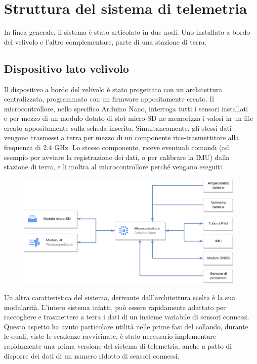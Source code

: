 \documentclass[12pt]{article}
\begin{document}
\section{Struttura del sistema di telemetria}
In linea generale, il sistema è stato articolato in due nodi. Uno installato a bordo del velivolo e l'altro complementare, parte di una stazione di terra.

\subsection{Dispositivo lato velivolo}
Il dispositivo a bordo del velivolo è stato progettato con un architettura centralizzata, programmato con un firmware appositamente creato. Il microcontrollore, nello specifico Arduino Nano, interroga tutti i sensori installati e per mezzo di un modulo dotato di slot micro-SD ne memorizza i valori in un file creato appositamente sulla scheda inserita. Simultaneamente, gli stessi dati vengono trasmessi a terra per mezzo di un componente rice-trasmettitore alla frequenza di 2.4 GHz. Lo stesso componente, riceve eventuali comandi (ad esempio per avviare la registrazione dei dati, o per calibrare la IMU) dalla stazione di terra, e li inoltra al microcontrollore perché vengano eseguiti.

\begin{figure}[h]
	\centering
	\includegraphics[width=13cm]{img/RADAR-Arch}
\end{figure}

\noindent
Un altra caratteristica del sistema, derivante dall'architettura scelta è la sua modularità. L'intero sistema infatti, può essere rapidamente adattato per raccogliere e trasmettere a terra i dati di un insieme variabile di sensori connessi. Questo aspetto ha avuto particolare utilità nelle prime fasi del collaudo, durante le quali, viste le scadenze ravvicinate, è stato necessario implementare rapidamente una prima versione del sistema di telemetria, anche a patto di disporre dei dati di un numero ridotto di sensori connessi.
\end{document}
